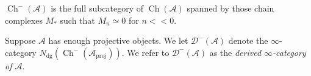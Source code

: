 \documentclass{MetricNotes2023}
\DeclareMathOperator{\Ch}{Ch}
\begin{document}
\begin{ourproof}
\begin{definition}
\(\Ch^-(\mathcal{A})\) is the full subcategory of \(\Ch(\mathcal{A})\) spanned by those chain complexes \(M_*\) such that \(M_n \simeq 0\) for \(n << 0\). 
\end{definition}

\begin{definition}
Suppose \(\mathcal{A}\) has enough projective objects. We let \(\mathcal{D}^-(\mathcal{A})\) denote the \(\infty\)-category \(N_{\text{dg}}(\Ch^-(\mathcal{A}_{\text{proj}}))\). We refer to \(\mathcal{D}^-(\mathcal{A})\) as the \textit{derived \(\infty\)-category of \(\mathcal{A}\)}.  
\end{definition}


\end{ourproof}
\end{document}
